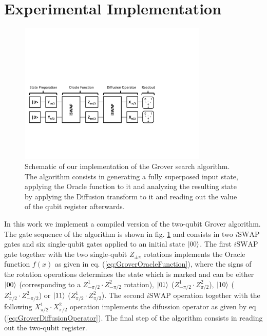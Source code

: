 \section{Experimental Implementation}

\begin{figure}[ht!]
	\centering
		\includegraphics[width=0.8\textwidth]{./material/papers/grover/grover_algorithm}
	\caption[Schematic of our implementation of the Grover search algorithm]{Schematic of our implementation of the Grover search algorithm. The algorithm consists in generating a fully superposed input state, applying the Oracle function to it and analyzing the resulting state by applying the Diffusion transform to it and reading out the value of the qubit register afterwards.}
	\label{fig:GroverAlgorithmSchematic}
\end{figure}

In this work we implement a compiled version of the two-qubit Grover algorithm. The gate sequence of the algorithm is shown in fig. \ref{fig:GroverAlgorithmSchematic} and consists in two $i\mathrm{SWAP}$ gates and six single-qubit gates applied to an initial state $\left| 00 \right>$. The first $i\mathrm{SWAP}$ gate together with the two single-qubit $Z_{\pm \pi}$ rotations implements the Oracle function $f(x)$ as given in eq. (\ref{eq:GroverOracleFunction}), where the signs of the rotation operations determines the state which is marked and can be either $\left| 00 \right>$ (corresponding to a $Z^1_{-\pi/2}\cdot Z^2_{-\pi/2}$ rotation), $\left| 01 \right>$ ($Z^1_{-\pi/2}\cdot Z^2_{\pi/2}$), $\left| 10 \right>$ ($Z^1_{\pi/2}\cdot Z^2_{-\pi/2}$) or $\left| 11 \right>$ ($Z^1_{\pi/2}\cdot Z^2_{\pi/2}$). The second $i\mathrm{SWAP}$ operation together with the following $X^1_{\pi/2}\cdot X^2_{\pi/2}$ operation implements the difussion operator as given by eq (\ref{eq:GroverDiffusionOperator}). The final step of the algorithm consists in reading out the two-qubit register.

